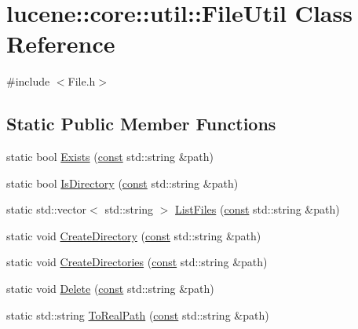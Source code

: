 \hypertarget{classlucene_1_1core_1_1util_1_1FileUtil}{}\section{lucene\+:\+:core\+:\+:util\+:\+:File\+Util Class Reference}
\label{classlucene_1_1core_1_1util_1_1FileUtil}


{\ttfamily \#include $<$File.\+h$>$}

\subsection*{Static Public Member Functions}
\begin{DoxyCompactItemize}
\item 
static bool \mbox{\hyperlink{classlucene_1_1core_1_1util_1_1FileUtil_a486cd10f84cdf1919b99ca8b80d67a40}{Exists}} (\mbox{\hyperlink{ZlibCrc32_8h_a2c212835823e3c54a8ab6d95c652660e}{const}} std\+::string \&path)
\item 
static bool \mbox{\hyperlink{classlucene_1_1core_1_1util_1_1FileUtil_ab4499db0057a23c203d36da5c4a66239}{Is\+Directory}} (\mbox{\hyperlink{ZlibCrc32_8h_a2c212835823e3c54a8ab6d95c652660e}{const}} std\+::string \&path)
\item 
static std\+::vector$<$ std\+::string $>$ \mbox{\hyperlink{classlucene_1_1core_1_1util_1_1FileUtil_aeedee4e7e2cc1280d6c948ce7c7d82c9}{List\+Files}} (\mbox{\hyperlink{ZlibCrc32_8h_a2c212835823e3c54a8ab6d95c652660e}{const}} std\+::string \&path)
\item 
static void \mbox{\hyperlink{classlucene_1_1core_1_1util_1_1FileUtil_a93414b851dfb9d3e0cdabade88caca63}{Create\+Directory}} (\mbox{\hyperlink{ZlibCrc32_8h_a2c212835823e3c54a8ab6d95c652660e}{const}} std\+::string \&path)
\item 
static void \mbox{\hyperlink{classlucene_1_1core_1_1util_1_1FileUtil_ab626b04521245beb0d5f031bcca6536d}{Create\+Directories}} (\mbox{\hyperlink{ZlibCrc32_8h_a2c212835823e3c54a8ab6d95c652660e}{const}} std\+::string \&path)
\item 
static void \mbox{\hyperlink{classlucene_1_1core_1_1util_1_1FileUtil_a060865ee48abca5c98dd073040ed95d4}{Delete}} (\mbox{\hyperlink{ZlibCrc32_8h_a2c212835823e3c54a8ab6d95c652660e}{const}} std\+::string \&path)
\item 
static std\+::string \mbox{\hyperlink{classlucene_1_1core_1_1util_1_1FileUtil_a07d88b9c9d327de8bef27ed90a22e0ef}{To\+Real\+Path}} (\mbox{\hyperlink{ZlibCrc32_8h_a2c212835823e3c54a8ab6d95c652660e}{const}} std\+::string \&path)

\end{DoxyCompactItemize}
